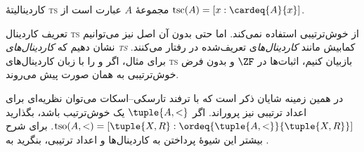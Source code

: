 \documentclass[../../../include/open-logic-section]{subfiles}
\begin{document}
\begin{defn}
کاردینالیتهٔ \textsc{ts} مجموعهٔ $A$ عبارت است از
$\text{tsc}(A) = [x : \cardeq{A}{x}]$.
\end{defn}

تعریف کاردینال \textsc{ts} از خوش‌ترتیبی استفاده نمی‌کند. اما حتی بدون
آن اصل نیز می‌توانیم نشان دهیم که \emph{کاردینال‌های \textsc{ts}} کمابیش
مانند \emph{کاردینال‌ها}ی تعریف‌شده در
 رفتار می‌کنند. برای
مثال، اگر  و
 را با زبان
کاردینال‌های \textsc{ts} بازبیان کنیم، اثبات‌ها در $\ZF$ و بدون فرض
خوش‌ترتیبی به همان صورت پیش می‌روند.

در همین زمینه شایان ذکر است که با ترفند تارسکی--اسکات می‌توان نظریه‌ای
برای اعداد ترتیبی نیز پروراند. اگر $\tuple{A, <}$ یک خوش‌ترتیب باشد،
بگذارید $\text{tso}(A, <) = [\tuple{X, R} :
\ordeq{\tuple{A, <}}{\tuple{X, R}}]$. برای شرح بیشتر این شیوهٔ پرداختن
به کاردینال‌ها و اعداد ترتیبی، بنگرید به
\citet[chs.~9--12]{Potter2004}.
\end{document}
